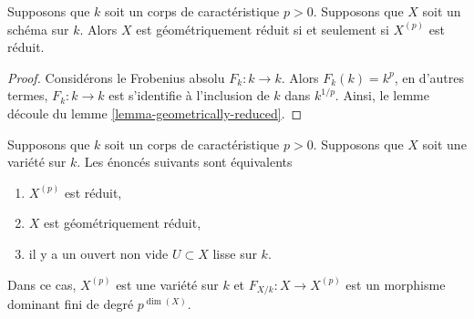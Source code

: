 \begin{lemma}
\label{lemma-geometrically-reduced-p}
Supposons que $k$ soit un corps de caractéristique $p > 0$. Supposons que $X$ soit un
schéma sur $k$. Alors $X$ est géométriquement réduit si et seulement si $X^{(p)}$ est réduit.
\end{lemma}

\begin{proof}
Considérons le Frobenius absolu $F_k : k \to k$. Alors
$F_k(k) = k^p$, en d'autres termes, $F_k : k \to k$ est
s'identifie à l'inclusion de $k$ dans $k^{1/p}$. Ainsi, le
lemme découle du lemme \ref{lemma-geometrically-reduced}.
\end{proof}

\begin{lemma}
\label{lemma-inseparable-deg-p-smooth}
Supposons que $k$ soit un corps de caractéristique $p > 0$. Supposons
que $X$ soit une variété sur $k$. Les énoncés suivants sont équivalents
\begin{enumerate}
\item $X^{(p)}$ est réduit, \item $X$ est
géométriquement réduit, \item il y a un
ouvert non vide $U \subset X$ lisse sur $k$.
\end{enumerate}
Dans ce cas, $X^{(p)}$ est une variété sur $k$ et $F_{X/k} : X
\to X^{(p)}$ est un morphisme dominant fini de degré $p^{\dim(X)}$.
\end{lemma}

